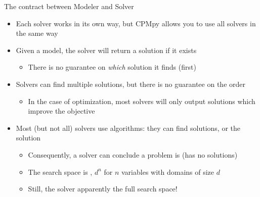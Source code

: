 \documentclass{cons-beamer}
\begin{document}
\begin{frame}{The contract between Modeler and Solver}

	\begin{itemize}
		\item Each solver works in its own way, but  CPMpy allows you to use all solvers in  the same way
		\item Given a model, the solver will  return a solution if it exists
			\begin{itemize}
				\item There is no guarantee on \textit{which} solution it finds (first)
			\end{itemize}
		\item Solvers can find multiple solutions, but there is no guarantee on the order
			\begin{itemize}
				\item In the case of optimization, most solvers will only output  solutions which improve the objective
			\end{itemize}
		\item Most (but not all) solvers use  algorithms: they can find  solutions, or the  solution 
			\begin{itemize}
				\item Consequently, a solver can conclude a problem is  (\ie has no solutions)
				\item The search space is , \eg $d^n$ for $n$ variables with domains of size $d$
				\item Still, the solver apparently  the full search space!
			\end{itemize}
	\end{itemize}
\end{frame}
\end{document}
